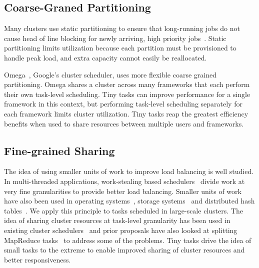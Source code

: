 \subsection{Coarse-Graned Partitioning}
Many clusters use static partitioning to ensure that long-running jobs do not
cause head of line blocking for newly arriving, high priority
jobs~\cite{thusoo2010data}. Static partitioning limits utilization because each
partition must be provisioned to handle peak load, and extra capacity cannot
easily be reallocated.


Omega~\cite{wilkes2013omega}, Google's cluster scheduler, uses more flexible coarse
grained partitioning. Omega shares a cluster across many frameworks that
each perform their own task-level scheduling. Tiny tasks can improve performance
for a single framework in this context, but performing task-level scheduling
separately for each framework limits cluster utilization.
Tiny tasks reap the greatest efficiency benefits when used to share resources
between multiple users and frameworks.
\subsection{Fine-grained Sharing}
The idea of using smaller units of work to improve load balancing is well
studied.  In multi-threaded applications, work-stealing
based schedulers~\cite{blumofe1994scheduling} divide work at very fine granularities to provide better load
balancing.  Smaller units of work have also been used in
operating systems~\cite{sherman1972trace}, storage systems~\cite{chang2008bigtable,ghemawat2003google} and distributed hash tables~\cite{stoica2001chord}. We apply this
principle to tasks scheduled in large-scale clusters.  The
idea of sharing cluster resources at task-level granularity has been used in
existing cluster schedulers~\cite{hindman2011mesos, zaharia2010delay} and prior
proposals have also looked at splitting MapReduce tasks~\cite{bhatotia2011incoop} to
address some of the problems.
Tiny tasks drive the idea of small tasks to the extreme to enable improved
sharing of cluster resources
and better responsiveness.

